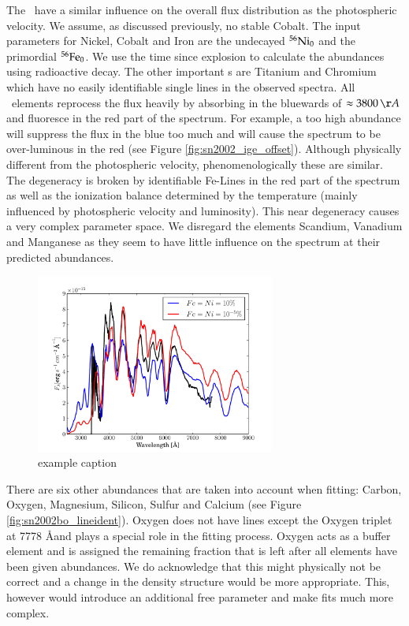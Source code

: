 The \ige\ have a similar influence on the overall flux distribution as the photospheric velocity. 
We assume, as discussed previously, no stable Cobalt. The input parameters for Nickel, Cobalt and Iron are the undecayed $^{56}\textrm{Ni}_0$ and the primordial $^{56}\textrm{Fe}_0$. We use the time since explosion to calculate the abundances using radioactive decay. The other important \ige s are Titanium and Chromium which have no easily identifiable single lines in the observed spectra.  All \ige\ elements reprocess the flux heavily by absorbing in the bluewards of $\approx 3800\,\AA$ and fluoresce in the red part of the spectrum. For example, a too high abundance will suppress the flux in the blue too much and will cause the spectrum to be over-luminous in the red (see Figure \ref{fig:sn2002_ige_offset}). Although physically different from the photospheric velocity, phenomenologically these are similar. The degeneracy is broken by identifiable Fe-Lines in the red part of the spectrum as well as the ionization balance determined by the temperature (mainly influenced by photospheric velocity and luminosity). This near degeneracy causes a very complex parameter space. We disregard the elements Scandium, Vanadium and  Manganese as they seem to have little influence on the spectrum at their predicted abundances.

\begin{figure}[htbp] %
   \centering
   \includegraphics[width=0.7\textwidth]{chapter_dalek/plots/bf2002bo-10_ige.pdf} 
   \caption{example caption}
   \label{fig:sn2002bo_ige_offset}
\end{figure}

There are six other abundances that are taken into account when fitting: Carbon, Oxygen, Magnesium, Silicon, Sulfur and Calcium (see Figure \ref{fig:sn2002bo_lineident}). Oxygen does not have lines except the Oxygen triplet at 7778 \AA and plays a special role in the fitting process. Oxygen acts as a buffer element and is assigned the remaining fraction that is left after all elements have been given abundances. We do acknowledge that this might physically not be correct and a change in the density structure would be more appropriate. This, however would introduce an additional free parameter and make fits much more complex.

